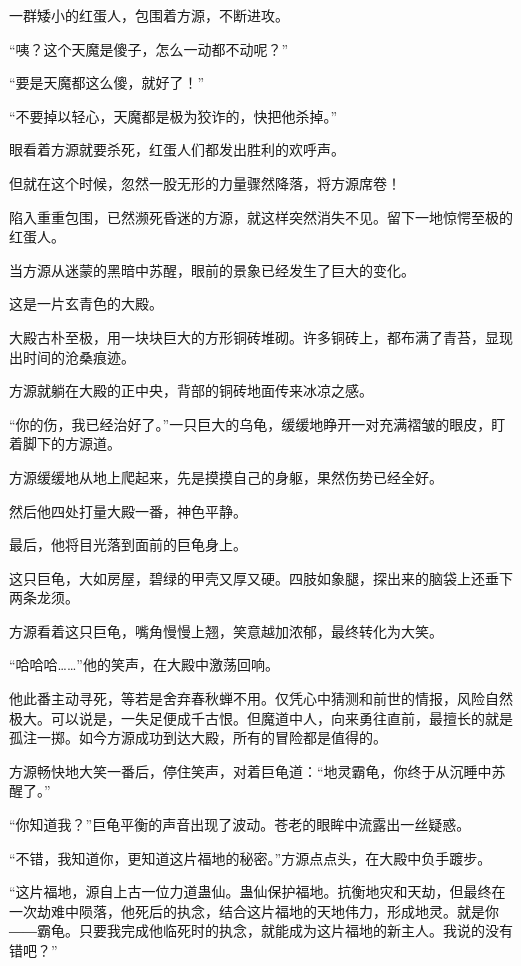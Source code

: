 
\begin{this_body}

一群矮小的红蛋人，包围着方源，不断进攻。

“咦？这个天魔是傻子，怎么一动都不动呢？”

“要是天魔都这么傻，就好了！”

“不要掉以轻心，天魔都是极为狡诈的，快把他杀掉。”

眼看着方源就要杀死，红蛋人们都发出胜利的欢呼声。

但就在这个时候，忽然一股无形的力量骤然降落，将方源席卷！

陷入重重包围，已然濒死昏迷的方源，就这样突然消失不见。留下一地惊愕至极的红蛋人。

当方源从迷蒙的黑暗中苏醒，眼前的景象已经发生了巨大的变化。

这是一片玄青色的大殿。

大殿古朴至极，用一块块巨大的方形铜砖堆砌。许多铜砖上，都布满了青苔，显现出时间的沧桑痕迹。

方源就躺在大殿的正中央，背部的铜砖地面传来冰凉之感。

“你的伤，我已经治好了。”一只巨大的乌龟，缓缓地睁开一对充满褶皱的眼皮，盯着脚下的方源道。

方源缓缓地从地上爬起来，先是摸摸自己的身躯，果然伤势已经全好。

然后他四处打量大殿一番，神色平静。

最后，他将目光落到面前的巨龟身上。

这只巨龟，大如房屋，碧绿的甲壳又厚又硬。四肢如象腿，探出来的脑袋上还垂下两条龙须。

方源看着这只巨龟，嘴角慢慢上翘，笑意越加浓郁，最终转化为大笑。

“哈哈哈……”他的笑声，在大殿中激荡回响。

他此番主动寻死，等若是舍弃春秋蝉不用。仅凭心中猜测和前世的情报，风险自然极大。可以说是，一失足便成千古恨。但魔道中人，向来勇往直前，最擅长的就是孤注一掷。如今方源成功到达大殿，所有的冒险都是值得的。

方源畅快地大笑一番后，停住笑声，对着巨龟道：“地灵霸龟，你终于从沉睡中苏醒了。”

“你知道我？”巨龟平衡的声音出现了波动。苍老的眼眸中流露出一丝疑惑。

“不错，我知道你，更知道这片福地的秘密。”方源点点头，在大殿中负手踱步。

“这片福地，源自上古一位力道蛊仙。蛊仙保护福地。抗衡地灾和天劫，但最终在一次劫难中陨落，他死后的执念，结合这片福地的天地伟力，形成地灵。就是你――霸龟。只要我完成他临死时的执念，就能成为这片福地的新主人。我说的没有错吧？”


\end{this_body}
